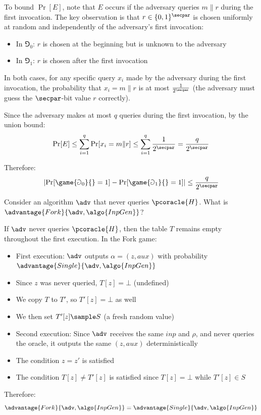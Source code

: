 \begin{mysolution}
  To bound $\Pr[E]$, note that $E$ occurs if the adversary queries $m \| r$ during the first invocation. The key observation is that $r \in \{0,1\}^\secpar$ is chosen uniformly at random and independently of the adversary's first invocation:
  \begin{itemize}
    \item In $\Game_0$: $r$ is chosen at the beginning but is unknown to the adversary
    \item In $\Game_1$: $r$ is chosen after the first invocation
  \end{itemize}
  
  In both cases, for any specific query $x_i$ made by the adversary during the first invocation, the probability that $x_i = m \| r$ is at most $\frac{1}{2^\secpar}$ (the adversary must guess the $\secpar$-bit value $r$ correctly).
  
  Since the adversary makes at most $q$ queries during the first invocation, by the union bound:
  \[
  \Pr[E] \leq \sum_{i=1}^q \Pr[x_i = m \| r] \leq \sum_{i=1}^q \frac{1}{2^\secpar} = \frac{q}{2^\secpar}
  \]
  
  Therefore:
  \[
  \left|\Pr[\game{\Game_0}{} = 1] - \Pr[\game{\Game_1}{} = 1]\right| \leq \frac{q}{2^\secpar}
  \]
\end{mysolution}
\fi

\begin{exercise}
  Consider an algorithm $\adv$ that never queries $\pcoracle{H}$. What is $\advantage{Fork}{\adv, \algo{InpGen}}$?
\end{exercise}

\ifsolutions
\begin{mysolution}
  If $\adv$ never queries $\pcoracle{H}$, then the table $T$ remains empty throughout the first execution. In the Fork game:
  
  \begin{itemize}
    \item First execution: $\adv$ outputs $\alpha = (z, \mathit{aux})$ with probability $\advantage{Single}{\adv, \algo{InpGen}}$
    \item Since $z$ was never queried, $T[z] = \bot$ (undefined)
    \item We copy $T$ to $T'$, so $T'[z] = \bot$ as well
    \item We then set $T'[z] \sample S$ (a fresh random value)
    \item Second execution: Since $\adv$ receives the same $\mathit{inp}$ and $\rho$, and never queries the oracle, it outputs the same $(z, \mathit{aux})$ deterministically
    \item The condition $z = z'$ is satisfied
    \item The condition $T[z] \neq T'[z]$ is satisfied since $T[z] = \bot$ while $T'[z] \in S$
  \end{itemize}
  
  Therefore:
  \[
  \advantage{Fork}{\adv, \algo{InpGen}} = \advantage{Single}{\adv, \algo{InpGen}}
  \]
\end{mysolution}
\fi

